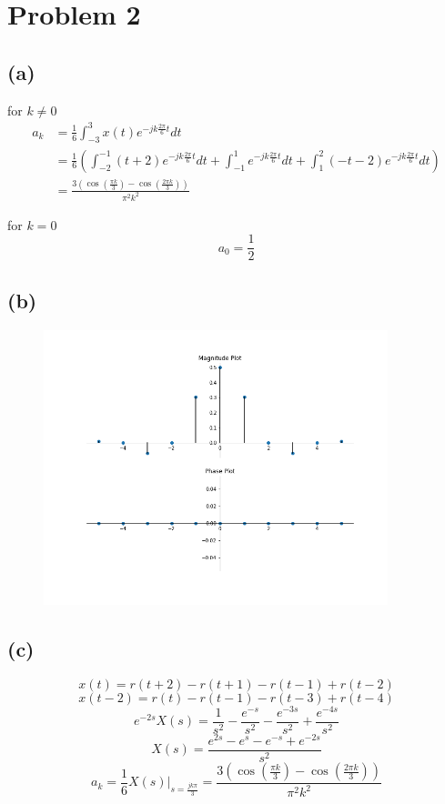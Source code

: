 \documentclass[12pt]{article}
\begin{document}
\section*{Problem 2}
\subsection*{(a)}
for $k\neq 0$
\begin{align*}
a_k&=\frac{1}{6}\int_{-3}^{3}x(t)e^{-jk\frac{2\pi}{6}t}dt\\
&=\frac{1}{6}\left(\int_{-2}^{-1}(t+2)e^{-jk\frac{2\pi}{6}t}dt+\int_{-1}^{1}e^{-jk\frac{2\pi}{6}t}dt+\int_{1}^{2}(-t-2)e^{-jk\frac{2\pi}{6}t}dt\right)\\
&=\frac{3(\cos(\frac{\pi k}{3})-\cos(\frac{2\pi k}{3}))}{\pi^2k^2}
\end{align*}

for $k=0$
$$a_0=\frac{1}{2}$$
\subsection*{(b)}
\begin{center}
\begin{figure}[h]\includegraphics[width=10cm]{fig1}
\end{figure}
\end{center}
\pagebreak
\subsection*{(c)}
$$x(t)=r(t+2)-r(t+1)-r(t-1)+r(t-2)$$
$$x(t-2)=r(t)-r(t-1)-r(t-3)+r(t-4)$$
$$e^{-2s}X(s)=\frac{1}{s^2}-\frac{e^{-s}}{s^2}-\frac{e^{-3s}}{s^2}+\frac{e^{-4s}}{s^2}$$
$$X(s)=\frac{e^{2s}-e^s-e^{-s}+e^{-2s}}{s^2}$$
$$a_k=\frac{1}{6}\left.X(s)\right|_{s=\frac{jk\pi}{3}}=\frac{3(\cos(\frac{\pi k}{3})-\cos(\frac{2\pi k}{3}))}{\pi^2k^2}$$
\end{document}
